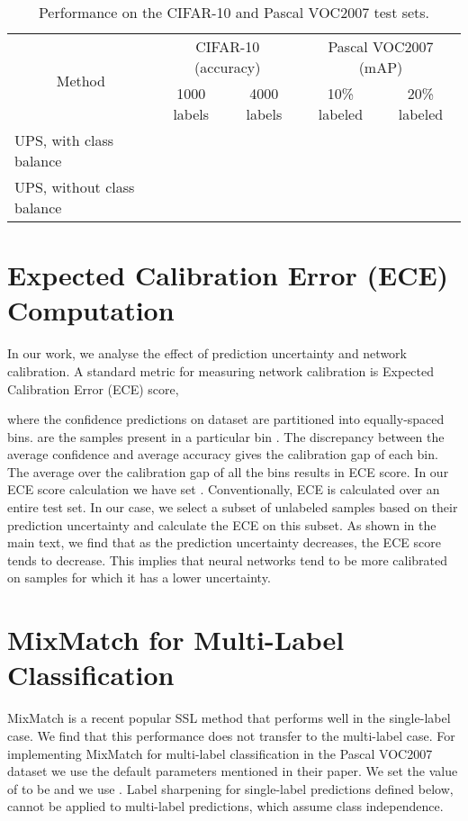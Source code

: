 \documentclass{article} \usepackage{iclr2021_conference,times}
\begin{document}
\begin{table}[h]
\caption{Performance on the CIFAR-10 and Pascal VOC2007 test sets.}
\label{tab:class_balanced_cifar10_pascalvoc}
\centering
\small
\begin{tabular}{l|cc|cc}
\hline
\multicolumn{1}{c|}{\multirow{2}{*}{Method}} & \multicolumn{2}{c|}{CIFAR-10 (accuracy)} & \multicolumn{2}{c}{Pascal VOC2007 (mAP)} \\  
\multicolumn{1}{c|}{} & 1000 labels & 4000 labels & 10\% labeled & 20\% labeled \\ \hline
UPS, with class balance &  &  &  &  \\
UPS, without class balance &  &  &  &  \\
 
\hline
\end{tabular}
\end{table}


\section{Expected Calibration Error (ECE) Computation}
\label{sec:ece}

In our work, we analyse the effect of prediction uncertainty and network calibration. A standard metric for measuring network calibration is Expected Calibration Error (ECE) \citep{pmlr-v70-guo17a, Xing2020Distance-Based} score,


where the confidence predictions on dataset  are partitioned into  equally-spaced bins.  are the samples present in a particular bin . The discrepancy between the average confidence and average accuracy gives the calibration gap of each bin. The average over the calibration gap of all the bins results in ECE score. In our ECE score calculation we have set . Conventionally, ECE is calculated over an entire test set. In our case, we select a subset of unlabeled samples based on their prediction uncertainty and calculate the ECE on this subset. As shown in the main text, we find that as the prediction uncertainty decreases, the ECE score tends to decrease. This implies that neural networks tend to be more calibrated on samples for which it has a lower uncertainty.



\section{MixMatch for Multi-Label Classification}
\label{sec:mixmatch}
MixMatch \citep{NIPS2019_8749_MixMatch} is a recent popular SSL method that performs well in the single-label case. We find that this performance does not transfer to the multi-label case. For implementing MixMatch for multi-label classification in the Pascal VOC2007 dataset we use the default parameters mentioned in their paper. We set the value of  to be  and we use . Label sharpening for single-label predictions defined below, cannot be applied to multi-label predictions, which assume class independence.
\end{document}
